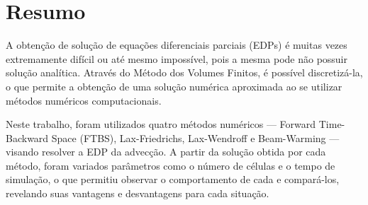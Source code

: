 \chapter{Resumo}

A obtenção de solução de equações diferenciais parciais (EDPs) é muitas vezes
extremamente difícil ou até mesmo impossível, pois a mesma pode não possuir
solução analítica. Através do Método dos Volumes Finitos, é possível
discretizá-la, o que permite a obtenção de uma solução numérica aproximada ao
se utilizar métodos numéricos computacionais.

Neste trabalho, foram utilizados quatro métodos numéricos --- Forward
Time-Backward Space (FTBS), Lax-Friedrichs, Lax-Wendroff e Beam-Warming ---
visando resolver a EDP da advecção. A partir da solução obtida por cada método,
foram variados parâmetros como o número de células e o tempo de simulação, o
que permitiu observar o comportamento de cada e compará-los, revelando suas
vantagens e desvantagens para cada situação.